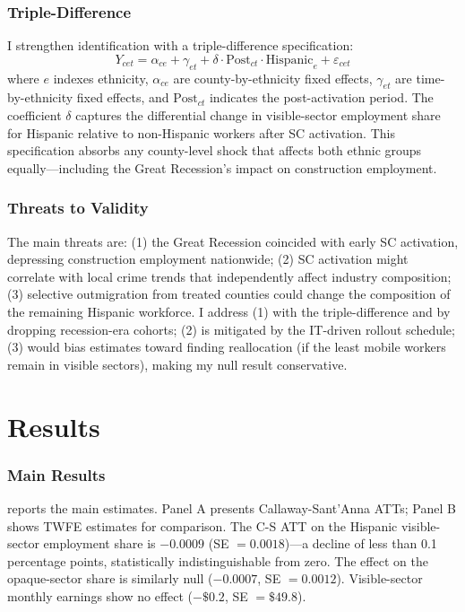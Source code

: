 \documentclass[12pt]{article}
\begin{document}
\subsubsection*{Triple-Difference} I strengthen identification with a triple-difference specification:
\begin{equation}
    Y_{cet} = \alpha_{ce} + \gamma_{et} + \delta \cdot \text{Post}_{ct} \cdot \text{Hispanic}_e + \varepsilon_{cet}
\end{equation}
where $e$ indexes ethnicity, $\alpha_{ce}$ are county-by-ethnicity fixed effects, $\gamma_{et}$ are time-by-ethnicity fixed effects, and $\text{Post}_{ct}$ indicates the post-activation period. The coefficient $\delta$ captures the differential change in visible-sector employment share for Hispanic relative to non-Hispanic workers after SC activation. This specification absorbs any county-level shock that affects both ethnic groups equally---including the Great Recession's impact on construction employment.

\subsubsection*{Threats to Validity} The main threats are: (1) the Great Recession coincided with early SC activation, depressing construction employment nationwide; (2) SC activation might correlate with local crime trends that independently affect industry composition; (3) selective outmigration from treated counties could change the composition of the remaining Hispanic workforce. I address (1) with the triple-difference and by dropping recession-era cohorts; (2) is mitigated by the IT-driven rollout schedule; (3) would bias estimates toward finding reallocation (if the least mobile workers remain in visible sectors), making my null result conservative.


\section{Results}
\label{sec:results}

\subsubsection*{Main Results}  reports the main estimates. Panel A presents Callaway-Sant'Anna ATTs; Panel B shows TWFE estimates for comparison. The C-S ATT on the Hispanic visible-sector employment share is $-0.0009$ (SE $= 0.0018$)---a decline of less than 0.1 percentage points, statistically indistinguishable from zero. The effect on the opaque-sector share is similarly null ($-0.0007$, SE $= 0.0012$). Visible-sector monthly earnings show no effect ($-\$0.2$, SE $= \$49.8$).
\end{document}
